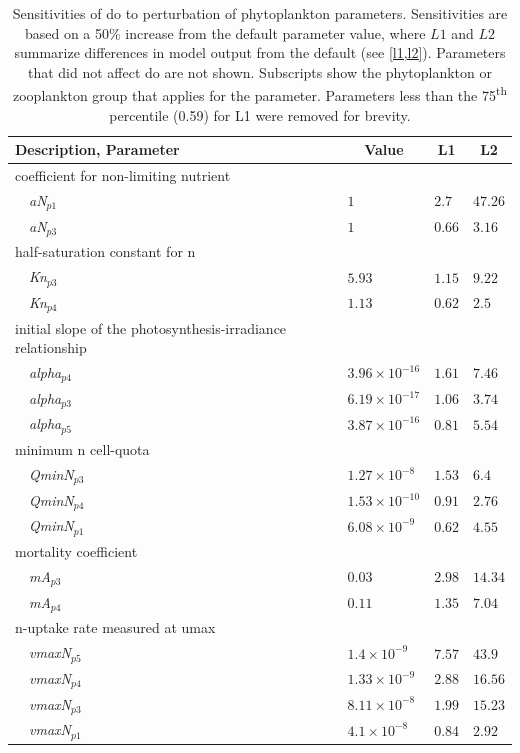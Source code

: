 \documentclass[letterpaper,12pt,oneside]{article}\usepackage[]{graphicx}\usepackage[]{color}
\begin{document}
\begin{table}[!tbp]
{\normalsize
\caption{Sensitivities of \ac{do} to perturbation of phytoplankton parameters.  Sensitivities are based on a 50\% increase from the default parameter value, where $L1$ and $L2$ summarize differences in model output from the default (see \cref{l1,l2}).  Parameters that did not affect \ac{do} are not shown.  Subscripts show the phytoplankton or zooplankton group that applies for the parameter. Parameters less than the 75\textsuperscript{th} percentile (0.59) for L1 were removed for brevity.\label{tab:phytosens}} 
\begin{center}
\begin{tabular}{llll}
\hline\hline
\multicolumn{1}{l}{Description, Parameter}&\multicolumn{1}{c}{Value}&\multicolumn{1}{c}{L1}&\multicolumn{1}{c}{L2}\tabularnewline
\hline
{coefficient for non-limiting nutrient}&&&\tabularnewline
~~\textit{aN$_{p1}$}&$1$&$2.7$&$47.26$\tabularnewline
~~\textit{aN$_{p3}$}&$1$&$0.66$&$3.16$\tabularnewline
\hline
{half-saturation constant for n}&&&\tabularnewline
~~\textit{Kn$_{p3}$}&$5.93$&$1.15$&$9.22$\tabularnewline
~~\textit{Kn$_{p4}$}&$1.13$&$0.62$&$2.5$\tabularnewline
\hline
{initial slope of the photosynthesis-irradiance relationship}&&&\tabularnewline
~~\textit{alpha$_{p4}$}&$3.96\times 10^{-16}$&$1.61$&$7.46$\tabularnewline
~~\textit{alpha$_{p3}$}&$6.19\times 10^{-17}$&$1.06$&$3.74$\tabularnewline
~~\textit{alpha$_{p5}$}&$3.87\times 10^{-16}$&$0.81$&$5.54$\tabularnewline
\hline
{minimum n cell-quota}&&&\tabularnewline
~~\textit{QminN$_{p3}$}&$1.27\times 10^{-8}$&$1.53$&$6.4$\tabularnewline
~~\textit{QminN$_{p4}$}&$1.53\times 10^{-10}$&$0.91$&$2.76$\tabularnewline
~~\textit{QminN$_{p1}$}&$6.08\times 10^{-9}$&$0.62$&$4.55$\tabularnewline
\hline
{mortality coefficient}&&&\tabularnewline
~~\textit{mA$_{p3}$}&$0.03$&$2.98$&$14.34$\tabularnewline
~~\textit{mA$_{p4}$}&$0.11$&$1.35$&$7.04$\tabularnewline
\hline
{n-uptake rate measured at umax}&&&\tabularnewline
~~\textit{vmaxN$_{p5}$}&$1.4\times 10^{-9}$&$7.57$&$43.9$\tabularnewline
~~\textit{vmaxN$_{p4}$}&$1.33\times 10^{-9}$&$2.88$&$16.56$\tabularnewline
~~\textit{vmaxN$_{p3}$}&$8.11\times 10^{-8}$&$1.99$&$15.23$\tabularnewline
~~\textit{vmaxN$_{p1}$}&$4.1\times 10^{-8}$&$0.84$&$2.92$\tabularnewline

\end{tabular}
\end{center}}
\end{table}
\end{document}
